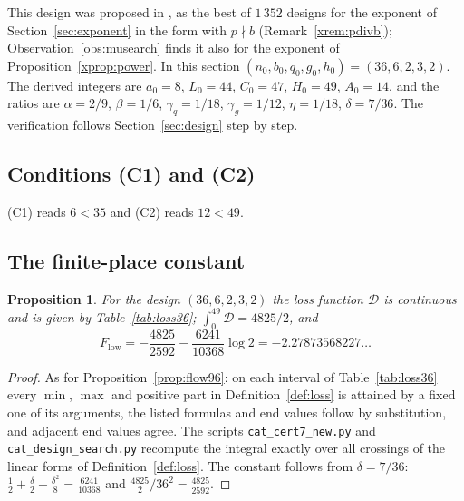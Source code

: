 \documentclass[11pt]{article}
\newtheorem{proposition}[theorem]{Proposition}
\theoremstyle{definition}
\newcommand{\Dl}{\mathcal{D}}
\begin{document}
This design was proposed in \cite{Bojnal}, as the best of $1\,352$ designs for the exponent of Section~\ref{sec:exponent} in the form with $p\nmid b$ (Remark~\ref{xrem:pdivb}); Observation~\ref{obs:musearch} finds it also for the exponent of Proposition~\ref{xprop:power}. In this section $(n_0,b_0,q_0,g_0,h_0)=(36,6,2,3,2)$. The derived integers are $a_0=8$, $L_0=44$, $C_0=47$, $H_0=49$, $A_0=14$, and the ratios are $\alpha=2/9$, $\beta=1/6$, $\gamma_q=1/18$, $\gamma_g=1/12$, $\eta=1/18$, $\delta=7/36$. The verification follows Section~\ref{sec:design} step by step.

\subsection{Conditions (C1) and (C2)}
(C1) reads $6<35$ and (C2) reads $12<49$.

\subsection{The finite-place constant}

\begin{proposition}\label{prop:flow36}
For the design $(36,6,2,3,2)$ the loss function $\Dl$ is continuous and is given by Table~\ref{tab:loss36}; $\int_0^{49}\Dl=4825/2$, and
\[
F_{\mathrm{low}}=-\frac{4825}{2592}-\frac{6241}{10368}\log2=-2.27873568227\ldots
\]
\end{proposition}

\begin{proof}
As for Proposition~\ref{prop:flow96}: on each interval of Table~\ref{tab:loss36} every $\min$, $\max$ and positive part in Definition~\ref{def:loss} is attained by a fixed one of its arguments, the listed formulas and end values follow by substitution, and adjacent end values agree. The scripts \texttt{cat\_cert7\_new.py} and \texttt{cat\_design\_search.py} recompute the integral exactly over all crossings of the linear forms of Definition~\ref{def:loss}. The constant follows from $\delta=7/36$: $\frac12+\frac\delta2+\frac{\delta^2}8=\frac{6241}{10368}$ and $\frac{4825}{2}/36^2=\frac{4825}{2592}$.
\end{proof}
\end{document}

